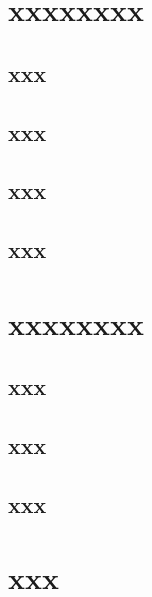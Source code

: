 \section{xxxxxxxx}

\subsection{xxx}
\label{sec:1a}


\subsection{xxx}
\label{sec:1b}


\subsection{xxx}
\label{sec:1c}


\subsection{xxx}
\label{sec:1d}


\section{xxxxxxxx}

\subsection{xxx}
\label{sec:2a}


\subsection{xxx}
\label{sec:2b}


\subsection{xxx}
\label{sec:2c}


\section{xxx}
